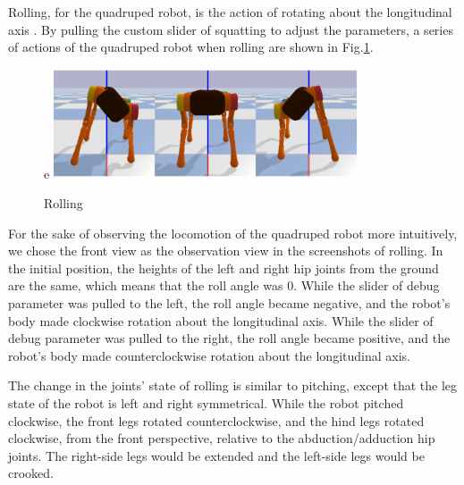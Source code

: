 Rolling, for the quadruped robot, is the action of rotating about the longitudinal axis \cite{ref:6DOF}. By pulling the custom slider of squatting to adjust the parameters, a series of actions of the quadruped robot when rolling are shown in Fig.\ref{fig: rolling}.

\begin{figure}[htbp]e
    \centering
    \includegraphics[width=0.8\textwidth]{figures/rolling.png}
    \caption{Rolling}
    \label{fig: rolling}
\end{figure}

For the sake of observing the locomotion of the quadruped robot more intuitively, we chose the front view as the observation view in the screenshots of rolling. In the initial position, the heights of the left and right hip joints from the ground are the same, which means that the roll angle was 0. While the slider of debug parameter was pulled to the left, the roll angle became negative, and the robot's body made clockwise rotation about the longitudinal axis. While the slider of debug parameter was pulled to the right, the roll angle became positive, and the robot's body made counterclockwise rotation about the longitudinal axis.

The change in the joints' state of rolling is similar to pitching, except that the leg state of the robot is left and right symmetrical. While the robot pitched clockwise, the front legs rotated counterclockwise, and the hind legs rotated clockwise, from the front perspective, relative to the abduction/adduction hip joints. The right-side legs would be extended and the left-side legs would be crooked.

